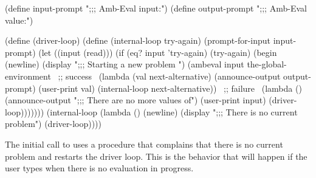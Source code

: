 \begin{codeBlock}
(define input-prompt  ";;; Amb-Eval input:")
(define output-prompt ";;; Amb-Eval value:")

(define (driver-loop)
  (define (internal-loop try-again)
    (prompt-for-input input-prompt)
    (let ((input (read)))
      (if (eq? input 'try-again)
          (try-again)
          (begin
            (newline) (display ";;; Starting a new problem ")
            (ambeval
             input
             the-global-environment
             ~\textrm{;;  success}~
             (lambda (val next-alternative)
               (announce-output output-prompt)
               (user-print val)
               (internal-loop next-alternative))
             ~\textrm{;;  failure}~
             (lambda ()
               (announce-output
                ";;; There are no more values of")
               (user-print input)
               (driver-loop)))))))
  (internal-loop
   (lambda ()
     (newline) (display ";;; There is no current problem")
     (driver-loop))))
\end{codeBlock}

\noindent
The initial call to  uses a  procedure that
complains that there is no current problem and restarts the driver loop.  This
is the behavior that will happen if the user types  when there
is no evaluation in progress.

